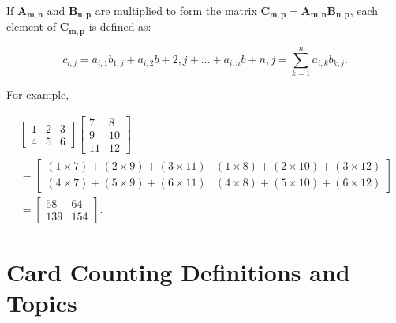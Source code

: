 If $\boldsymbol{A_{m,n}}$ and $\boldsymbol{B_{n,p}}$ are multiplied
to form the matrix $\boldsymbol{C_{m,p}} = \boldsymbol{A_{m,n}} \boldsymbol{B_{n,p}}$,
each element of $\boldsymbol{C_{m,p}}$ is defined as:

\begin{equation}
\label{eq:cmct0:smtp0:smop0:04}
c_{i,j} = a_{i,1} b_{1,j} + a_{i,2} b+{2,j} + \ldots +
a_{i,n} b+{n,j} =
\sum_{k=1}^{n} a_{i,k} b_{k,j}
.
\end{equation}

For example,

\begin{eqnarray}
\nonumber & \left[ \begin{array}{ccc}
1 & 2 & 3 \\
4 & 5 & 6
\end{array}\right] 
\left[ \begin{array}{cc}
 7 & 8   \\
 9 & 10  \\
11 & 12
\end{array}\right] & \\
\label{eq:cmct0:smtp0:smop0:05}
& =
\left[ \begin{array}{cc}
(1 \times 7) + (2 \times 9) + (3 \times 11) & (1 \times 8) + (2 \times 10) + (3 \times 12) \\
(4 \times 7) + (5 \times 9) + (6 \times 11) & (4 \times 8) + (5 \times 10) + (6 \times 12)
\end{array}\right] & \\
\nonumber & =
\left[ \begin{array}{cc}
58 & 64 \\
139 & 154
\end{array}\right] .
\end{eqnarray}


\section{Card Counting Definitions and Topics}
\label{cmct0:sctp0}




